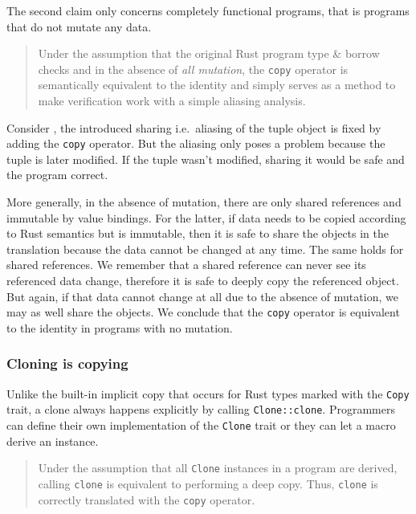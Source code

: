 The second claim only concerns completely functional programs, that is
programs that do not mutate any data.

\begin{quote}
Under the assumption that the original Rust program type \& borrow
checks and in the absence of \emph{all mutation}, the
\passthrough{\lstinline!copy!} operator is semantically equivalent to
the identity and simply serves as a method to make verification work
with a simple aliasing analysis.
\end{quote}

Consider , the introduced sharing
i.e.~aliasing of the tuple object is fixed by adding the
\passthrough{\lstinline!copy!} operator. But the aliasing only poses a
problem because the tuple is later modified. If the tuple wasn't
modified, sharing it would be safe and the program correct.

More generally, in the absence of mutation, there are only shared
references and immutable by value bindings. For the latter, if data
needs to be copied according to Rust semantics but is immutable, then it
is safe to share the objects in the translation because the data cannot
be changed at any time. The same holds for shared references. We
remember that a shared reference can never see its referenced data
change, therefore it is safe to deeply copy the referenced object. But
again, if that data cannot change at all due to the absence of mutation,
we may as well share the objects. We conclude that the
\passthrough{\lstinline!copy!} operator is equivalent to the identity in
programs with no mutation.

\subsubsection{Cloning is copying}
\label{sec:clone-is-copy}

Unlike the built-in implicit copy that occurs for Rust types marked with
the \passthrough{\lstinline!Copy!} trait, a clone always happens
explicitly by calling \passthrough{\lstinline!Clone::clone!}.
Programmers can define their own implementation of the
\passthrough{\lstinline!Clone!} trait or they can let a macro derive an
instance.

\begin{quote}
Under the assumption that all \passthrough{\lstinline!Clone!} instances
in a program are derived, calling \passthrough{\lstinline!clone!} is
equivalent to performing a deep copy. Thus,
\passthrough{\lstinline!clone!} is correctly translated with the
\passthrough{\lstinline!copy!} operator.
\end{quote}

